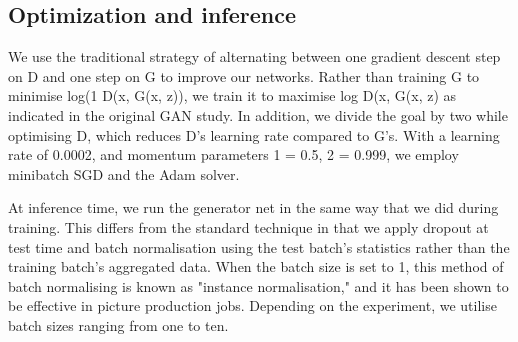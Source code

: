 \subsection{Optimization and inference}

\par We use the traditional strategy of alternating between one gradient descent step on D and one step on G to improve our networks. Rather than training G to minimise log(1 D(x, G(x, z)), we train it to maximise log D(x, G(x, z) as indicated in the original GAN study. In addition, we divide the goal by two while optimising D, which reduces D's learning rate compared to G's. With a learning rate of 0.0002, and momentum parameters 1 = 0.5, 2 = 0.999, we employ minibatch SGD and the Adam solver.

\par At inference time, we run the generator net in the same way that we did during training. This differs from the standard technique in that we apply dropout at test time and batch normalisation using the test batch's statistics rather than the training batch's aggregated data. When the batch size is set to 1, this method of batch normalising is known as "instance normalisation," and it has been shown to be effective in picture production jobs. Depending on the experiment, we utilise batch sizes ranging from one to ten.